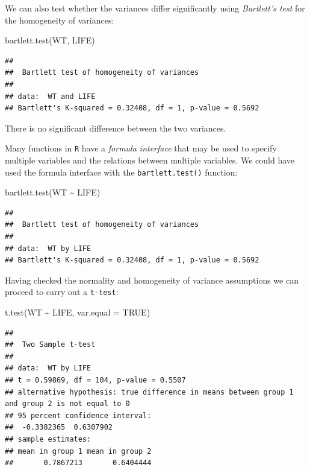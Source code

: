 \documentclass[
  12pt,
]{book}
\newenvironment{Shaded}{\begin{snugshade}}{\end{snugshade}}
\newcommand{\AttributeTok}[1]{\textcolor[rgb]{0.77,0.63,0.00}{#1}}
\newcommand{\ConstantTok}[1]{\textcolor[rgb]{0.00,0.00,0.00}{#1}}
\newcommand{\FunctionTok}[1]{\textcolor[rgb]{0.00,0.00,0.00}{#1}}
\newcommand{\NormalTok}[1]{#1}
\newcommand{\SpecialCharTok}[1]{\textcolor[rgb]{0.00,0.00,0.00}{#1}}
\begin{document}
\newpage

We can also test whether the variances differ significantly using \emph{Bartlett's test} for the homogeneity of variances:

\begin{Shaded}
\begin{Highlighting}[]
\FunctionTok{bartlett.test}\NormalTok{(WT, LIFE)}
\end{Highlighting}
\end{Shaded}

\begin{verbatim}
## 
##  Bartlett test of homogeneity of variances
## 
## data:  WT and LIFE
## Bartlett's K-squared = 0.32408, df = 1, p-value = 0.5692
\end{verbatim}

There is no significant difference between the two variances.

Many functions in \texttt{R} have a \emph{formula interface} that may be used to specify multiple variables and the relations between multiple variables. We could have used the formula interface with the \texttt{bartlett.test()} function:

\begin{Shaded}
\begin{Highlighting}[]
\FunctionTok{bartlett.test}\NormalTok{(WT }\SpecialCharTok{\textasciitilde{}}\NormalTok{ LIFE)}
\end{Highlighting}
\end{Shaded}

\begin{verbatim}
## 
##  Bartlett test of homogeneity of variances
## 
## data:  WT by LIFE
## Bartlett's K-squared = 0.32408, df = 1, p-value = 0.5692
\end{verbatim}

Having checked the normality and homogeneity of variance assumptions we can proceed to carry out a \texttt{t-test}:

\begin{Shaded}
\begin{Highlighting}[]
\FunctionTok{t.test}\NormalTok{(WT }\SpecialCharTok{\textasciitilde{}}\NormalTok{ LIFE, }\AttributeTok{var.equal =} \ConstantTok{TRUE}\NormalTok{)}
\end{Highlighting}
\end{Shaded}

\begin{verbatim}
## 
##  Two Sample t-test
## 
## data:  WT by LIFE
## t = 0.59869, df = 104, p-value = 0.5507
## alternative hypothesis: true difference in means between group 1 and group 2 is not equal to 0
## 95 percent confidence interval:
##  -0.3382365  0.6307902
## sample estimates:
## mean in group 1 mean in group 2 
##       0.7867213       0.6404444
\end{verbatim}
\end{document}
